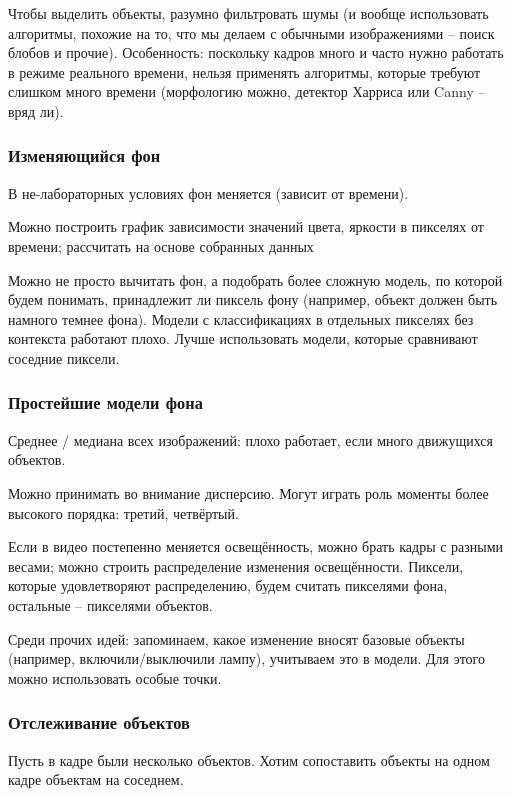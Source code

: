 \documentclass[main.tex]{subfiles}
\begin{document}
Чтобы выделить объекты, разумно фильтровать шумы (и вообще использовать алгоритмы, похожие на то, что мы делаем с обычными изображениями -- поиск блобов и прочие).
Особенность: поскольку кадров много и часто нужно работать в режиме реального времени, нельзя применять алгоритмы, которые требуют слишком много времени (морфологию можно, детектор Харриса или Canny -- вряд ли).

\subsubsection{Изменяющийся фон}

В не-лабораторных условиях фон меняется (зависит от времени).

Можно построить график зависимости значений цвета, яркости в пикселях от времени; рассчитать на основе собранных данных

Можно не просто вычитать фон, а подобрать более сложную модель, по которой будем понимать, принадлежит ли пиксель фону (например, объект должен быть намного темнее фона).
Модели с классификациях в отдельных пикселях без контекста работают плохо.
Лучше использовать модели, которые сравнивают соседние пиксели.

\subsubsection{Простейшие модели фона}

Среднее / медиана всех изображений: плохо работает, если много движущихся объектов.

Можно принимать во внимание дисперсию.
Могут играть роль моменты более высокого порядка: третий, четвёртый.

Если в видео постепенно меняется освещённость, можно брать кадры с разными весами; можно строить распределение изменения освещённости.
Пиксели, которые удовлетворяют распределению, будем считать пикселями фона, остальные -- пикселями объектов.

Среди прочих идей: запоминаем, какое изменение вносят базовые объекты (например, включили/выключили лампу), учитываем это в модели.
Для этого можно использовать особые точки.

\subsubsection{Отслеживание объектов}

Пусть в кадре были несколько объектов.
Хотим сопоставить объекты на одном кадре объектам на соседнем.
\end{document}
